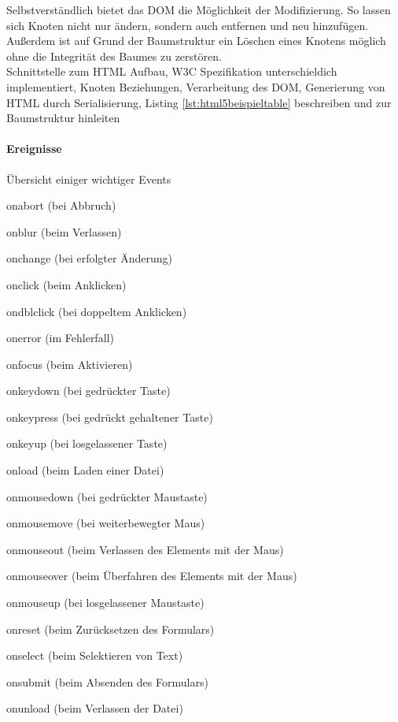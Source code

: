\documentclass[12pt,a4paper,bibliography=totocnumbered,listof=totocnumbered]{scrartcl}
\begin{document}
Selbstverständlich bietet das DOM die Möglichkeit der Modifizierung. So lassen sich Knoten nicht nur ändern, sondern auch entfernen und neu hinzufügen. Außerdem ist auf Grund der Baumstruktur ein Löschen eines Knotens möglich ohne die Integrität des Baumes zu zerstören.\\

Schnittstelle zum HTML Aufbau, W3C Spezifikation unterschieldich implementiert, Knoten Beziehungen, Verarbeitung des DOM, Generierung von HTML durch Serialisierung, Listing \ref{lst:html5beispieltable} beschreiben und zur Baumstruktur hinleiten\\

\paragraph{Ereignisse} Übersicht einiger wichtiger Events
    \begin{compactitem}
	    \item onabort (bei Abbruch)
	    \item onblur (beim Verlassen)
	    \item onchange (bei erfolgter Änderung)
	    \item onclick (beim Anklicken)
	    \item ondblclick (bei doppeltem Anklicken)
	    \item onerror (im Fehlerfall)
	    \item onfocus (beim Aktivieren)
	    \item onkeydown (bei gedrückter Taste)
	    \item onkeypress (bei gedrückt gehaltener Taste)
	    \item onkeyup (bei losgelassener Taste)
	    \item onload (beim Laden einer Datei)
	    \item onmousedown (bei gedrückter Maustaste)
	    \item onmousemove (bei weiterbewegter Maus)
	    \item onmouseout (beim Verlassen des Elements mit der Maus)
	    \item onmouseover (beim Überfahren des Elements mit der Maus)
	    \item onmouseup (bei losgelassener Maustaste)
	    \item onreset (beim Zurücksetzen des Formulars)
	    \item onselect (beim Selektieren von Text)
	    \item onsubmit (beim Absenden des Formulars)
	    \item onunload (beim Verlassen der Datei)
    \end{compactitem}
\end{document}
